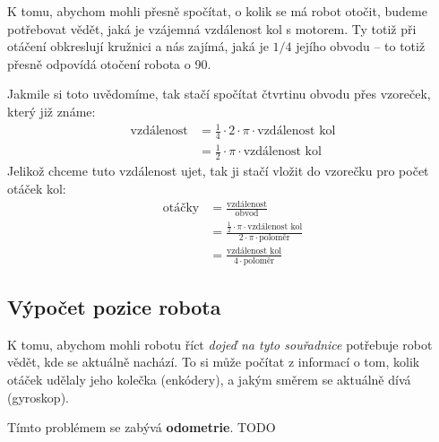 \documentclass[../main.tex]{subfiles}
\begin{document}
	\begin{solution*}
		K tomu, abychom mohli přesně spočítat, o kolik se má robot otočit, budeme potřebovat vědět, jaká je vzájemná vzdálenost kol s motorem. Ty totiž při otáčení obkreslují kružnici a nás zajímá, jaká je $1/4$ jejího obvodu -- to totiž přesně odpovídá otočení robota o 90\degree.

		Jakmile si toto uvědomíme, tak stačí spočítat čtvrtinu obvodu přes vzoreček, který již známe:
		$$
		\begin{aligned}
			\text{vzdálenost} &= \frac{1}{4} \cdot 2 \cdot \pi \cdot \text{vzdálenost kol} \\
			&= \frac{1}{2} \cdot \pi \cdot \text{vzdálenost kol}
		\end{aligned}
		$$
		Jelikož chceme tuto vzdálenost ujet, tak ji stačí vložit do vzorečku pro počet otáček kol:
		$$
		\begin{aligned}
			\text{otáčky} &= \frac{\text{vzdálenost}}{\text{obvod}} \\
			&=  \frac{\frac{1}{2} \cdot \pi \cdot \text{vzdálenost kol}}{2 \cdot \pi \cdot \text{poloměr}}  \\
			&= \frac{\text{vzdálenost kol}}{4 \cdot \text{poloměr}}
		\end{aligned}
		$$
	\end{solution*}

	\subsection{Výpočet pozice robota}
	K tomu, abychom mohli robotu říct \textit{dojeď na tyto souřadnice} potřebuje robot vědět, kde se aktuálně nachází. To si může počítat z informací o tom, kolik otáček udělaly jeho kolečka (enkódery), a jakým směrem se aktuálně dívá (gyroskop).

	Tímto problémem se zabývá \textbf{odometrie}. TODO
\end{document}

